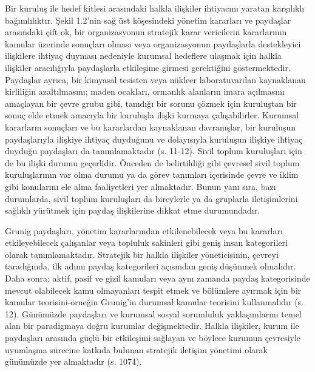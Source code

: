 \documentclass[
]{book}
\begin{document}
Bir kuruluş ile hedef kitlesi arasındaki halkla ilişkiler ihtiyacını yaratan karşılıklı bağımlılıktır. Şekil 1.2'nin sağ üst köşesindeki yönetim kararları ve paydaşlar arasındaki çift ok, bir organizasyonun stratejik karar vericilerin kararlarının kamular üzerinde sonuçları olması veya organizasyonun paydaşlarla destekleyici ilişkilere ihtiyaç duyması nedeniyle kurumsal hedeflere ulaşmak için halkla ilişkiler aracılığıyla paydaşlarla etkileşime girmesi gerektiğini göstermektedir. Paydaşlar ayrıca, bir kimyasal tesisten veya nükleer laboratuvardan kaynaklanan kirliliğin azaltılmasını; maden ocakları, ormanlık alanların imara açılmasını amaçlayan bir çevre grubu gibi, tanıdığı bir sorunu çözmek için kuruluştan bir sonuç elde etmek amacıyla bir kuruluşla ilişki kurmaya çalışabilirler. Kurumsal kararların sonuçları ve bu kararlardan kaynaklanan davranışlar, bir kuruluşun paydaşlarıyla ilişkiye ihtiyaç duyduğunu ve dolayısıyla kuruluşun ilişkiye ihtiyaç duyduğu paydaşları da tanımlamaktadır (s. 11-12). \citep{grunig2009paradigms} Sivil toplum kuruluşları için de bu ilişki durumu geçerlidir. Önceden de belirtildiği gibi çevresel sivil toplum kuruluşlarının var olma durumu ya da görev tanımları içerisinde çevre ve iklim gibi konularını ele alma faaliyetleri yer almaktadır. Bunun yanı sıra, bazı durumlarda, sivil toplum kuruluşları da bireylerle ya da gruplarla iletişimlerini sağlıklı yürütmek için paydaş ilişkilerine dikkat etme durumundadır.

Grunig paydaşları, yönetim kararlarından etkilenebilecek veya bu kararları etkileyebilecek çalışanlar veya topluluk sakinleri gibi geniş insan kategorileri olarak tanımlamaktadır. Stratejik bir halkla ilişkiler yöneticisinin, çevreyi taradığında, ilk adımı paydaş kategorileri açısından geniş düşünmek olmalıdır. Daha sonra; aktif, pasif ve gizil kamuları veya aynı zamanda paydaş kategorisinde mevcut olabilecek kamu olmayanları tespit etmek ve bölümlere ayırmak için bir kamular teorisini-örneğin Grunig'in durumsal kamular teorisini kullanmalıdır (s. 12). \citep{grunig2009paradigms} Günümüzde paydaşları ve kurumsal sosyal sorumluluk yaklaşımlarını temel alan bir paradigmaya doğru kurumlar değişmektedir. Halkla ilişkiler, kurum ile paydaşları arasında güçlü bir etkileşimi sağlayan ve böylece kurumun çevresiyle uyumlaşma sürecine katkıda bulunan stratejik iletişim yönetimi olarak günümüzde yer almaktadır (s. 1074). \citep{demir2018kamu}
\end{document}

